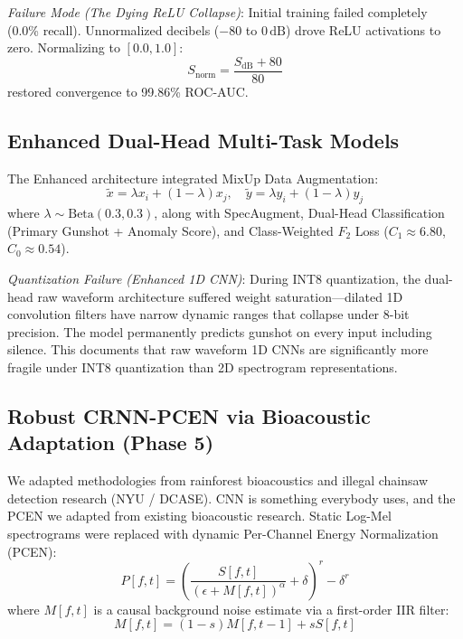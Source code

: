 \documentclass[conference]{IEEEtran}
\begin{document}
\textit{Failure Mode (The Dying ReLU Collapse)}: Initial training failed completely (0.0\% recall). Unnormalized decibels ($-80$ to $0\,\text{dB}$) drove ReLU activations to zero. Normalizing to $[0.0, 1.0]$:
\begin{equation}
    S_{\text{norm}} = \frac{S_{\text{dB}} + 80}{80}
    \label{eq:norm_db}
\end{equation}
restored convergence to 99.86\% ROC-AUC.

\subsection{Enhanced Dual-Head Multi-Task Models}
The Enhanced architecture integrated MixUp Data Augmentation:
\begin{equation}
    \tilde{x} = \lambda x_i + (1 - \lambda) x_j, \quad \tilde{y} = \lambda y_i + (1 - \lambda) y_j
    \label{eq:mixup}
\end{equation}
where $\lambda \sim \text{Beta}(0.3, 0.3)$, along with SpecAugment, Dual-Head Classification (Primary Gunshot + Anomaly Score), and Class-Weighted $F_2$ Loss ($C_1 \approx 6.80$, $C_0 \approx 0.54$).

\textit{Quantization Failure (Enhanced 1D CNN)}: During INT8 quantization, the dual-head raw waveform architecture suffered weight saturation---dilated 1D convolution filters have narrow dynamic ranges that collapse under 8-bit precision. The model permanently predicts gunshot on every input including silence. This documents that raw waveform 1D CNNs are significantly more fragile under INT8 quantization than 2D spectrogram representations.

\subsection{Robust CRNN-PCEN via Bioacoustic Adaptation (Phase 5)}
We adapted methodologies from rainforest bioacoustics and illegal chainsaw detection research (NYU / DCASE). CNN is something everybody uses, and the PCEN we adapted from existing bioacoustic research. Static Log-Mel spectrograms were replaced with dynamic Per-Channel Energy Normalization (PCEN):
\begin{equation}
    P[f, t] = \left( \frac{S[f, t]}{(\epsilon + M[f, t])^{\alpha}} + \delta \right)^r - \delta^r
    \label{eq:pcen}
\end{equation}
where $M[f, t]$ is a causal background noise estimate via a first-order IIR filter:
\begin{equation}
    M[f, t] = (1 - s) M[f, t-1] + s S[f, t]
    \label{eq:iir_smoother}
\end{equation}
\end{document}
